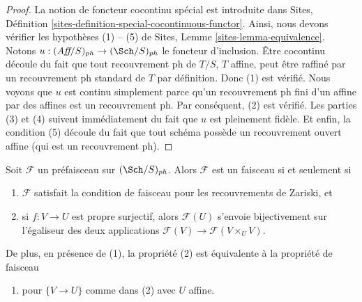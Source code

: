 \begin{proof}
La notion de foncteur cocontinu spécial est introduite dans Sites, Définition \ref{sites-definition-special-cocontinuous-functor}. Ainsi, nous devons vérifier les hypothèses (1) -- (5) de Sites, Lemme \ref{sites-lemma-equivalence}. Notons $u : (\textit{Aff}/S)_{ph} \to (\Sch/S)_{ph}$ le foncteur d'inclusion. Être cocontinu découle du fait que tout recouvrement ph de $T/S$, $T$ affine, peut être raffiné par un recouvrement ph standard de $T$ par définition. Donc (1) est vérifié. Nous voyons que $u$ est continu simplement parce qu'un recouvrement ph fini d'un affine par des affines est un recouvrement ph. Par conséquent, (2) est vérifié. Les parties (3) et (4) suivent immédiatement du fait que $u$ est pleinement fidèle. Et enfin, la condition (5) découle du fait que tout schéma possède un recouvrement ouvert affine (qui est un recouvrement ph).
\end{proof}

\begin{lemma}
\label{lemma-characterize-sheaf}
Soit $\mathcal{F}$ un préfaisceau sur $(\Sch/S)_{ph}$. Alors $\mathcal{F}$ est un faisceau si et seulement si
\begin{enumerate}
\item $\mathcal{F}$ satisfait la condition de faisceau pour les recouvrements de Zariski, et
\item si $f : V \to U$ est propre surjectif, alors $\mathcal{F}(U)$ s'envoie bijectivement sur l'égaliseur des deux applications $\mathcal{F}(V) \to \mathcal{F}(V \times_U V)$.
\end{enumerate}
De plus, en présence de (1), la propriété (2) est équivalente à la propriété de faisceau
\begin{enumerate}
\item[(2')] pour $\{V \to U\}$ comme dans (2) avec $U$ affine.
\end{enumerate}
\end{lemma}

